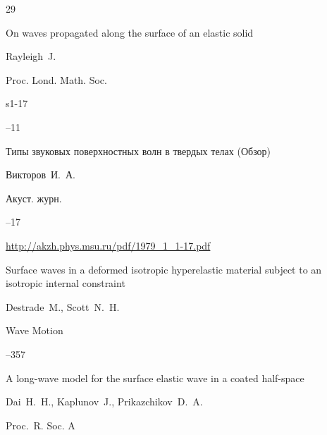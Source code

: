 \begin{thebibliography}{29}




\paper On waves propagated along the surface of an elastic solid

\by Rayleigh~J.

\jour Proc. Lond. Math. Soc. 


\vol s1-17


--11





\paper Типы звуковых поверхностных волн в твердых телах (Обзор)

\by Викторов~И.~А.

\jour Акуст. журн. 




--17

\elink \url{http://akzh.phys.msu.ru/pdf/1979_1_1-17.pdf}





\paper Surface waves in a deformed isotropic hyperelastic material subject to an isotropic internal constraint

\by Destrade~M., Scott~N.~H.

\jour Wave Motion




–357





\paper A long-wave model for the surface elastic wave in a coated half-space

\by Dai~H.~H., Kaplunov~J., Prikazchikov~D.~A.

\jour Proc.~R. Soc. A


\end{thebibliography}

